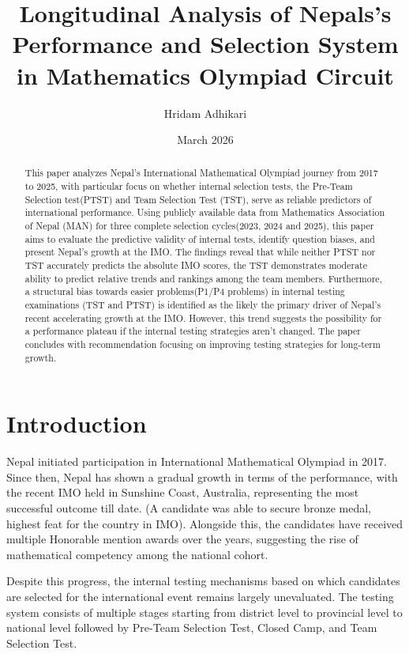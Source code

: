 \documentclass{report}
\title{Longitudinal Analysis of Nepals's Performance and Selection System in Mathematics Olympiad Circuit}
\author{Hridam Adhikari}
\date{March 2026}
\begin{document}
\maketitle

\begin{abstract}
This paper analyzes Nepal's International Mathematical Olympiad journey from 2017 to 2025, with particular focus on whether internal selection tests, the Pre-Team Selection test(PTST) and Team Selection Test (TST), serve as reliable predictors of international performance. Using publicly available data from Mathematics Association of Nepal (MAN) for three complete selection cycles(2023, 2024 and 2025), this paper aims to evaluate the predictive validity of internal tests, identify question biases, and present Nepal's growth at the IMO. The findings reveal that while neither PTST nor TST accurately predicts the absolute IMO scores, the TST demonstrates moderate ability to predict relative trends and rankings among the team members. Furthermore, a structural bias towards easier problems(P1/P4 problems) in internal testing examinations (TST and PTST) is identified as the likely the primary driver of Nepal's recent accelerating growth at the IMO. However, this trend suggests the possibility for a performance plateau if the internal testing strategies aren’t changed. The paper concludes with recommendation focusing on improving testing strategies for long-term growth.
\end{abstract}

\section{Introduction}
Nepal initiated participation in International Mathematical Olympiad in 2017. Since then, Nepal has shown a gradual growth in terms of the performance, with the recent IMO held in Sunshine Coast, Australia, representing the most successful outcome till date. (A candidate was able to secure bronze medal, highest feat for the country in IMO). Alongside this, the candidates have received multiple Honorable mention awards over the years, suggesting the rise of mathematical competency among the national cohort. 

Despite this progress, the internal testing mechanisms based on which candidates are selected for the international event remains largely unevaluated. The testing system consists of multiple stages starting from district level to provincial level to national level followed by Pre-Team Selection Test, Closed Camp, and Team Selection Test.
\end{document}
